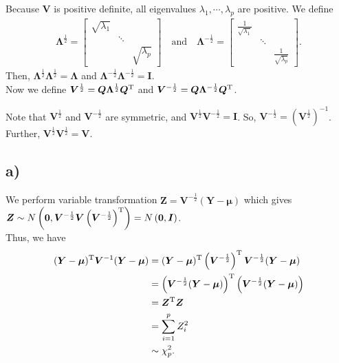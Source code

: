\documentclass[a4paper]{article}
\begin{document}
Because $\bm{V}$ is positive definite, all eigenvalues $\lambda_{1}, \cdots, \lambda_{p}$ are positive. We define
\begin{align*}
\bm{\Lambda}^{\frac{1}{2}} = 
\begin{bmatrix}
\sqrt{\lambda_{1}} & &\\
 & \ddots & \\
 &  & \sqrt{\lambda_{p}}
\end{bmatrix}
\quad \mbox{and} \quad
\bm{\Lambda}^{-\frac{1}{2}} = 
\begin{bmatrix}
\frac{1}{\sqrt{\lambda_{1}}} & &\\
 & \ddots & \\
 &  & \frac{1}{\sqrt{\lambda_{p}}}
\end{bmatrix}.
\end{align*}
Then, $\bm{\Lambda}^{\frac{1}{2}}\bm{\Lambda}^{\frac{1}{2}}  = \bm{\Lambda}$ and $\bm{\Lambda}^{-\frac{1}{2}}\bm{\Lambda}^{-\frac{1}{2}}  = \bm{I}$.\\
Now we define
$\bm{V}^{\frac{1}{2}} = \bm{Q}\bm{\Lambda}^{\frac{1}{2}}\bm{Q}^{\rm T}$ and $\bm{V}^{-\frac{1}{2}} = \bm{Q}\bm{\Lambda}^{-\frac{1}{2}}\bm{Q}^{\rm T}$.


Note that $\bm{V}^{\frac{1}{2}}$ and $\bm{V}^{-\frac{1}{2}}$ are symmetric, and $\bm{V}^{\frac{1}{2}}\bm{V}^{-\frac{1}{2}} = \bm{I}$. So, $\bm{V}^{-\frac{1}{2}} = \left(\bm{V}^{\frac{1}{2}}\right)^{-1}$. Further, $\bm{V}^{\frac{1}{2}}\bm{V}^{\frac{1}{2}} = \bm{V}$.


\subsection{a)}
We perform variable transformation $\bm{Z} = \bm{V}^{-\frac{1}{2}}(\bm{Y} - \bm{\mu})$ which gives $\bm{Z} \sim N\left(\bm{0}, \bm{V}^{-\frac{1}{2}}\bm{V}\left(\bm{V}^{-\frac{1}{2}}\right)^{\rm T} \right) = N\left(\bm{0}, \bm{I}\right)$.\\

Thus, we have
\begin{align*}
(\bm{Y} - \bm{\mu})^{\rm T}\bm{V}^{-1}(\bm{Y} - \bm{\mu})
&= (\bm{Y} - \bm{\mu})^{\rm T} \left(\bm{V}^{-\frac{1}{2}}\right)^{\rm T}\bm{V}^{-\frac{1}{2}} (\bm{Y} - \bm{\mu})\\
&= \left(\bm{V}^{-\frac{1}{2}}(\bm{Y} - \bm{\mu})\right)^{\rm T}\left(\bm{V}^{-\frac{1}{2}}(\bm{Y} - \bm{\mu})\right)\\
&= \bm{Z}^{\rm T}\bm{Z}\\
&= \sum_{i=1}^{p} Z_{i}^2\\
&\sim \chi_{p}^2.
\end{align*}
\end{document}
